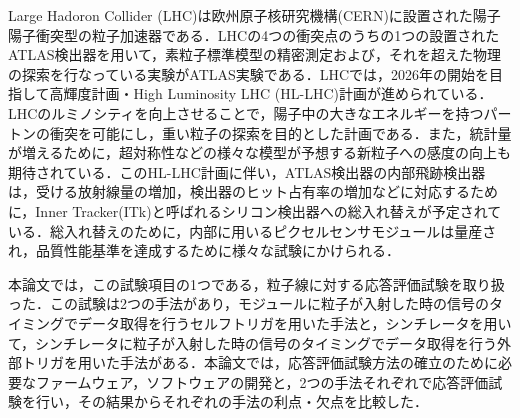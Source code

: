 Large Hadoron Collider (LHC)は欧州原子核研究機構(CERN)に設置された陽子陽子衝突型の粒子加速器である．LHCの4つの衝突点のうちの1つの設置されたATLAS検出器を用いて，素粒子標準模型の精密測定および，それを超えた物理の探索を行なっている実験がATLAS実験である．LHCでは，2026年の開始を目指して高輝度計画・High Luminosity LHC (HL-LHC)計画が進められている．LHCのルミノシティを向上させることで，陽子中の大きなエネルギーを持つパートンの衝突を可能にし，重い粒子の探索を目的とした計画である．また，統計量が増えるために，超対称性などの様々な模型が予想する新粒子への感度の向上も期待されている．このHL-LHC計画に伴い，ATLAS検出器の内部飛跡検出器は，受ける放射線量の増加，検出器のヒット占有率の増加などに対応するために，Inner Tracker(ITk)と呼ばれるシリコン検出器への総入れ替えが予定されている．総入れ替えのために，内部に用いるピクセルセンサモジュールは量産され，品質性能基準を達成するために様々な試験にかけられる．\par
本論文では，この試験項目の1つである，粒子線に対する応答評価試験を取り扱った．この試験は2つの手法があり，モジュールに粒子が入射した時の信号のタイミングでデータ取得を行うセルフトリガを用いた手法と，シンチレータを用いて，シンチレータに粒子が入射した時の信号のタイミングでデータ取得を行う外部トリガを用いた手法がある．本論文では，応答評価試験方法の確立のために必要なファームウェア，ソフトウェアの開発と，2つの手法それぞれで応答評価試験を行い，その結果からそれぞれの手法の利点・欠点を比較した．






